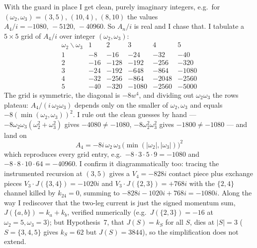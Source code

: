\documentclass{article}
\begin{document}
With the guard in place I get clean, purely imaginary integers, e.g.\ for
$(\omega_2,\omega_3)=(3,5)$, $(10,4)$, $(8,10)$ the values $A_4/i = -1080,\,
-5120,\,-40960$. So $A_n/i$ is real and I chase that. I tabulate a $5\times5$
grid of $A_4/i$ over integer $(\omega_2,\omega_3)$:
\[
\begin{array}{c|ccccc}
\omega_2\backslash\omega_3 & 1 & 2 & 3 & 4 & 5\\\hline
1 & -8 & -16 & -24 & -32 & -40\\
2 & -16 & -128 & -192 & -256 & -320\\
3 & -24 & -192 & -648 & -864 & -1080\\
4 & -32 & -256 & -864 & -2048 & -2560\\
5 & -40 & -320 & -1080 & -2560 & -5000
\end{array}
\]
The grid is symmetric, the diagonal is $-8w^4$, and dividing out $\omega_2\omega_3$
the rows plateau: $A_4/(i\,\omega_2\omega_3)$ depends only on the smaller of
$\omega_2,\omega_3$ and equals $-8(\min(\omega_2,\omega_3))^2$. I rule out the
clean guesses by hand --- $-8\omega_2\omega_3(\omega_2^2+\omega_3^2)$ gives
$-4080\ne-1080$, $-8\omega_2^2\omega_3^2$ gives $-1800\ne-1080$ --- and land on
\[
\boxed{\;A_4 = -8i\,\omega_2\,\omega_3\,\big(\min(|\omega_2|,|\omega_3|)\big)^2\;}
\]
which reproduces every grid entry, e.g.\ $-8\cdot3\cdot5\cdot9=-1080$ and
$-8\cdot8\cdot10\cdot64=-40960$. I confirm it diagrammatically too: tracing the
instrumented recursion at $(3,5)$ gives a $V_4=-828i$ contact piece plus exchange
pieces $V_3\cdot J(\{3,4\})=-1020i$ and $V_3\cdot J(\{2,3\})=+768i$ with the
$\{2,4\}$ channel killed by $k_{24}=0$, summing to $-828i-1020i+768i=-1080i$.
Along the way I rediscover that the two-leg current is just the signed momentum
sum, $J(\{a,b\})=k_a+k_b$, verified numerically (e.g.\ $J(\{2,3\})=-16$ at
$\omega_2=5,\omega_3=3$); but Hypothesis~7, that $J(S)=k_S$ for all $S$, dies at
$|S|=3$ ($S=\{3,4,5\}$ gives $k_S=62$ but $J(S)=3844$), so the simplification
does not extend.
\end{document}
